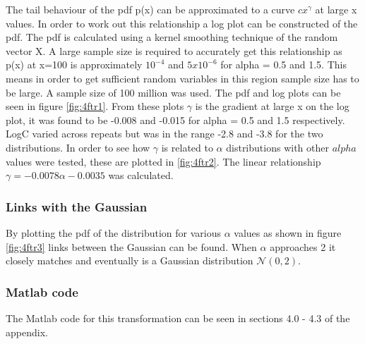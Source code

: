 \documentclass[twoside,twocolumn]{article}
\begin{document}
The tail behaviour of the pdf p(x) can be approximated to a curve $cx^\gamma$ at large x values. In order to work out this relationship a log plot can be constructed of the pdf. The pdf is calculated using a kernel smoothing technique of the random vector X. A large sample size is required to accurately get this relationship as p(x) at x=100 is approximately $10^{-4}$ and $5x10^{-6}$ for alpha = 0.5 and 1.5. This means in order to get sufficient random variables in this region sample size has to be large. A sample size of 100 million was used. The pdf and log plots can be seen in figure \ref{fig:4ftr1}. From these plots  $\gamma$ is the gradient at large x on the log plot, it was found to be -0.008 and -0.015 for alpha = 0.5 and 1.5 respectively. LogC varied across repeats but was in the range -2.8 and -3.8 for the two distributions. In order to see how $\gamma$ is related to $\alpha$ distributions with other $alpha$ values were tested, these are plotted in \ref{fig:4ftr2}. The linear relationship $\gamma=-0.0078\alpha-0.0035$ was calculated.

\subsubsection{Links with the Gaussian}

By plotting the pdf of the distribution for various $\alpha$ values as shown in figure \ref{fig:4ftr3} links between the Gaussian can be found. When $\alpha$ approaches 2 it closely matches and eventually is a Gaussian distribution $\mathcal{N}(0,2)$. 

\subsubsection{Matlab code} %
The Matlab code for this transformation can be seen in sections 4.0 - 4.3 of the appendix.
\end{document}
